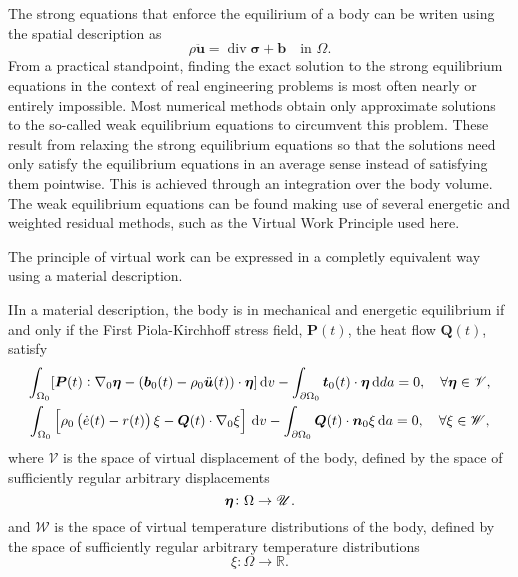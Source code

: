 The strong equations that enforce the equilirium of a body can be writen using the spatial description as
\begin{equation}
  \rho \ddot{\bm u} = \operatorname{div}\bm \sigma + \bm b\quad \text{in $\Omega.$}
\end{equation}
From a practical standpoint, finding the exact solution to the strong equilibrium equations in the context of real engineering problems is most often nearly or entirely impossible.
Most numerical methods obtain only approximate solutions to the so-called weak equilibrium equations to circumvent this problem.
These result from relaxing the strong equilibrium equations so that the solutions need only satisfy the equilibrium equations in an average sense instead of satisfying them pointwise.
This is achieved through an integration over the body volume.
The weak equilibrium equations can be found making use of several energetic and weighted residual methods, such as the Virtual Work Principle used here.
\enlargethispage{\baselineskip}

The principle of virtual work can be expressed in a completly equivalent way using a material description.
\begin{problem}
IIn a material description, the body is in mechanical and energetic equilibrium if and only if the First Piola-Kirchhoff stress field, \(\bm P(t)\), the heat flow \(\bm Q(t)\), satisfy
    \begin{gather}
        \int_{\Omega_0} [\bm{P}(t):\nabla_0 \bm{\eta} - (\bm{b}_0(t) - \rho_0 \ddot{\bm u}(t))\cdot \bm{\eta}]\,\mathrm{d} v - \int_{\partial\Omega_0} \bm{t}_0(t)\cdot \bm{\eta}\,\mathrm{d} da = 0,\quad \forall \bm{\eta} \in \mathscr{V},\\
          \int_{\Omega_0}   \left[\rho_0\left(\dot e (t)- r(t)\right) \xi - \bm Q(t)\cdot \nabla_0 \xi\right]\,\mathrm{d} v - \int_{\partial\Omega_0} \bm Q(t)\cdot \bm n_0 \xi\,\mathrm{d} a = 0,\quad \forall \xi \in \mathscr{W},
    \end{gather}
 where $\mathscr{V}$ is the space of virtual displacement of the body, defined by the space of sufficiently regular arbitrary displacements
 \begin{equation}
     \bm{\eta}\colon \Omega\to \mathscr{U}.
 \end{equation}
 and  $\mathscr{W}$ is the space of virtual temperature distributions of the body, defined by the space of sufficiently regular arbitrary temperature distributions
 \begin{equation}
     \xi\colon \Omega\to \mathbb R.
 \end{equation}
\end{problem}

